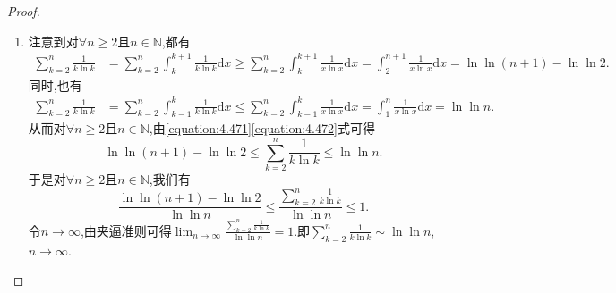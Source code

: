 \documentclass[../../main.tex]{subfiles}%
\begin{document}
\begin{proof}
\begin{enumerate}
\item 注意到对\(\forall n\geqslant 2\)且\(n\in\mathbb{N}\),都有
\begin{align}\label{equation:4.471}
\sum\limits_{k = 2}^n\frac{1}{k\ln k}&=\sum\limits_{k = 2}^n\int_{k}^{k + 1}\frac{1}{k\ln k}\mathrm{d}x
\geqslant\sum\limits_{k = 2}^n\int_{k}^{k + 1}\frac{1}{x\ln x}\mathrm{d}x
=\int_{2}^{n + 1}\frac{1}{x\ln x}\mathrm{d}x
=\ln\ln(n + 1) - \ln\ln 2.
\end{align}
同时,也有
\begin{align}\label{equation:4.472}
\sum\limits_{k = 2}^n\frac{1}{k\ln k}&=\sum\limits_{k = 2}^n\int_{k - 1}^{k}\frac{1}{k\ln k}\mathrm{d}x
\leqslant\sum\limits_{k = 2}^n\int_{k - 1}^{k}\frac{1}{x\ln x}\mathrm{d}x
=\int_{1}^{n}\frac{1}{x\ln x}\mathrm{d}x
=\ln\ln n.
\end{align}
从而对\(\forall n\geqslant 2\)且\(n\in\mathbb{N}\),由\eqref{equation:4.471}\eqref{equation:4.472}式可得
\[
\ln\ln(n + 1) - \ln\ln 2\leqslant\sum\limits_{k = 2}^n\frac{1}{k\ln k}\leqslant\ln\ln n.
\]
于是对\(\forall n\geqslant 2\)且\(n\in\mathbb{N}\),我们有
\[
\frac{\ln\ln(n + 1) - \ln\ln 2}{\ln\ln n}\leqslant\frac{\sum\limits_{k = 2}^n\frac{1}{k\ln k}}{\ln\ln n}\leqslant 1.
\]
令\(n\rightarrow\infty\),由夹逼准则可得\(\lim_{n\rightarrow\infty}\frac{\sum\limits_{k = 2}^n\frac{1}{k\ln k}}{\ln\ln n}=1\).即\(\sum\limits_{k = 2}^n\frac{1}{k\ln k}\sim\ln\ln n\),\(n\rightarrow\infty\).
\end{enumerate}

\end{proof}
\end{document}
